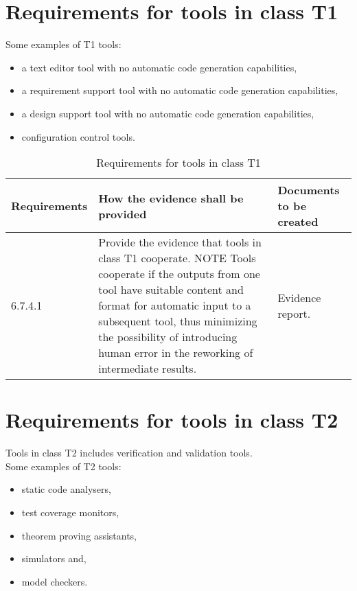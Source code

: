\documentclass{template/openetcs_report}
\begin{document}
\section{Requirements for tools in class T1}
\label{T1}
Some examples of T1 tools:
\begin{itemize}\itemsep=0pt
  \item a text editor tool with no automatic code generation capabilities,
  \item a requirement support tool with no automatic code generation capabilities,
  \item a design support tool with no automatic code generation capabilities,
  \item configuration control tools.
\end{itemize}

{\footnotesize\sffamily\centering
\begin{longtable}{|p{2cm}|p{9cm}|p{3cm}|}
\caption{Requirements for tools in class T1}\\
\hline
\bfseries Requirements & \bfseries How the evidence shall be provided & \bfseries Documents to be created\\
\hline
\hline
\endhead
\hline
\endfoot

6.7.4.1 & Provide the evidence that tools in class T1 cooperate.
\linebreak
\linebreak
NOTE \linebreak
Tools cooperate if the outputs from one tool have suitable content and format for automatic input to a subsequent tool, thus minimizing the possibility of introducing human error in the reworking of intermediate results. & Evidence report.\\ 
\hline

\end{longtable}}



\section{Requirements for tools in class T2}
\label{T2}
Tools in class T2 includes verification and validation tools.\\
Some examples of T2 tools:
\begin{itemize}\itemsep=0pt
  \item static code analysers,
  \item test coverage monitors,
  \item theorem proving assistants,
  \item simulators and,
  \item model checkers.
\end{itemize}
\end{document}
